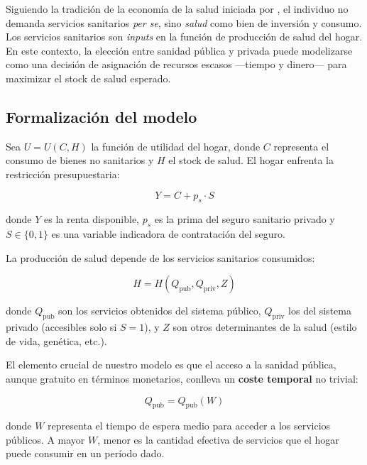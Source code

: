 Siguiendo la tradición de la economía de la salud iniciada por
\textcite{Grossman1972}, el individuo no demanda servicios sanitarios
\textit{per se}, sino \textit{salud} como bien de inversión y consumo. Los
servicios sanitarios son \textit{inputs} en la función de producción de salud del
hogar. En este contexto, la elección entre sanidad pública y privada puede
modelizarse como una decisión de asignación de recursos escasos ---tiempo y
dinero--- para maximizar el stock de salud esperado.

\subsection{Formalización del modelo}

Sea $U = U(C, H)$ la función de utilidad del hogar, donde $C$ representa el
consumo de bienes no sanitarios y $H$ el stock de salud. El hogar enfrenta la
restricción presupuestaria:

\begin{equation}
  Y = C + p_s \cdot S
  \label{eq:restriccion}
\end{equation}

donde $Y$ es la renta disponible, $p_s$ es la prima del seguro sanitario privado
y $S \in \{0,1\}$ es una variable indicadora de contratación del seguro.

La producción de salud depende de los servicios sanitarios consumidos:

\begin{equation}
  H = H(Q_{\text{pub}}, Q_{\text{priv}}, Z)
  \label{eq:produccion_salud}
\end{equation}

donde $Q_{\text{pub}}$ son los servicios obtenidos del sistema público,
$Q_{\text{priv}}$ los del sistema privado (accesibles solo si $S=1$), y $Z$ son
otros determinantes de la salud (estilo de vida, genética, etc.).

El elemento crucial de nuestro modelo es que el acceso a la sanidad pública,
aunque gratuito en términos monetarios, conlleva un \textbf{coste temporal} no
trivial:

\begin{equation}
  Q_{\text{pub}} = Q_{\text{pub}}(W)
  \label{eq:demanda_publica}
\end{equation}

donde $W$ representa el tiempo de espera medio para acceder a los servicios
públicos. A mayor $W$, menor es la cantidad efectiva de servicios que el hogar
puede consumir en un período dado.

